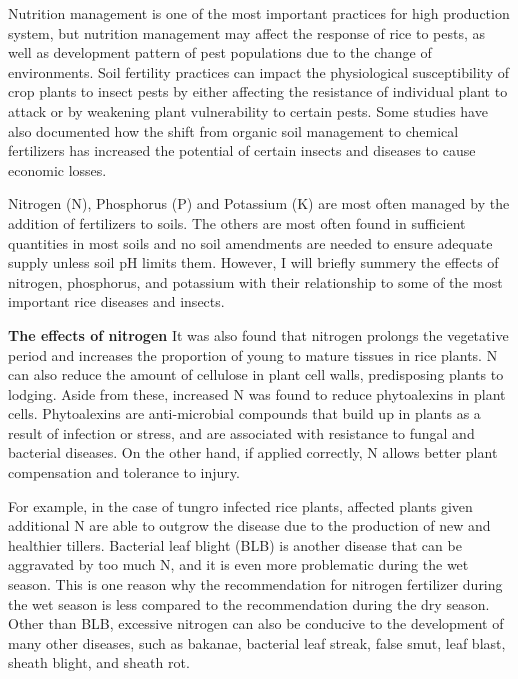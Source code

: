 Nutrition management is one of the most important practices for high production system, but nutrition management may affect the response of rice to pests, as well as development pattern of pest populations due to the change of environments. Soil fertility practices can impact the physiological susceptibility of crop plants to insect pests by either affecting the resistance of individual plant to attack or by weakening plant vulnerability to certain pests. Some studies have also documented how the shift from organic soil management to chemical fertilizers has increased the potential of certain insects and diseases to cause economic losses.

Nitrogen (N), Phosphorus (P) and Potassium (K) are most often managed by the addition of fertilizers to soils. The others are most often found in sufficient quantities in most soils and no soil amendments are needed to ensure adequate supply unless soil pH limits them. However, I will briefly summery the effects of nitrogen, phosphorus, and potassium with their relationship to some of the most important rice diseases and insects.

\textbf{The effects of nitrogen}
It was also found that nitrogen prolongs the vegetative period and increases the proportion of young to mature tissues in rice plants. N can also reduce the amount of cellulose in plant cell walls, predisposing plants to lodging. Aside from these, increased N was found to reduce phytoalexins in plant cells. Phytoalexins are anti-microbial compounds that build up in plants as a result of infection or stress, and are associated with resistance to fungal and bacterial diseases. On the other hand, if applied correctly, N allows better plant compensation and tolerance to injury. 

For example, in the case of tungro infected rice plants, affected plants given additional N are able to outgrow the disease due to the production of new and healthier tillers. Bacterial leaf blight (BLB) is another disease that can be aggravated by too much N, and it is even more problematic during the wet season. This is one reason why the recommendation for nitrogen fertilizer during the wet season is less compared to the recommendation during the dry season. Other than BLB, excessive nitrogen can also be conducive to the development of many other diseases, such as bakanae, bacterial leaf streak, false smut, leaf blast, sheath blight, and sheath rot.


